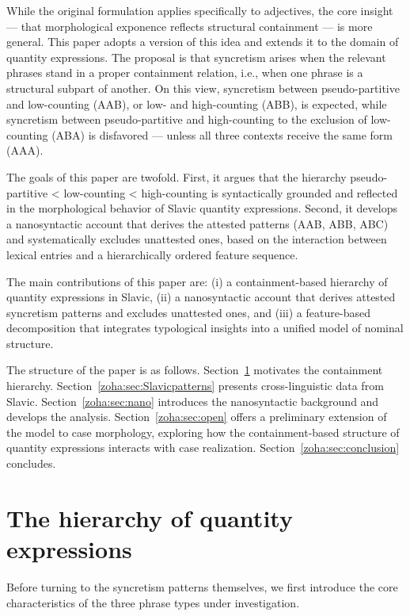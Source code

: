 \documentclass[output=paper,colorlinks,citecolor=brown
]{langscibook}
\begin{document}
While the original formulation applies specifically to adjectives, the core insight — that morphological exponence reflects structural containment — is more general. This paper adopts a version of this idea and extends it to the domain of quantity expressions. The proposal is that syncretism arises when the relevant phrases stand in a proper containment relation, i.e., when one phrase is a structural subpart of another. On this view, syncretism between pseudo-partitive and low-counting (AAB), or low- and high-counting (ABB), is expected, while syncretism between pseudo-partitive and high-counting to the exclusion of low-counting (ABA) is disfavored — unless all three contexts receive the same form (AAA).

The goals of this paper are twofold. First, it argues that the hierarchy pseudo-partitive < low-counting < high-counting is syntactically grounded and reflected in the morphological behavior of Slavic quantity expressions. Second, it develops a nanosyntactic account that derives the attested patterns (AAB, ABB, ABC) and systematically excludes unattested ones, based on the interaction between lexical entries and a hierarchically ordered feature sequence.

The main contributions of this paper are: (i) a containment-based hierarchy of quantity expressions in Slavic, (ii) a nanosyntactic account that derives attested syncretism patterns and excludes unattested ones, and (iii) a feature-based decomposition that integrates typological insights into a unified model of nominal structure.

The structure of the paper is as follows. Section~\ref{zoha:sec:hierarchy} motivates the containment hierarchy. Section~\ref{zoha:sec:Slavicpatterns} presents cross-linguistic data from Slavic. Section~\ref{zoha:sec:nano} introduces the nanosyntactic background and develops the analysis. Section~\ref{zoha:sec:open} offers a preliminary extension of the model to case morphology, exploring how the containment-based structure of quantity expressions interacts with case realization. Section~\ref{zoha:sec:conclusion} concludes.

\section{The hierarchy of quantity expressions}\label{zoha:sec:hierarchy}

Before turning to the syncretism patterns themselves, we first introduce the core characteristics of the three phrase types under investigation.
\end{document}
